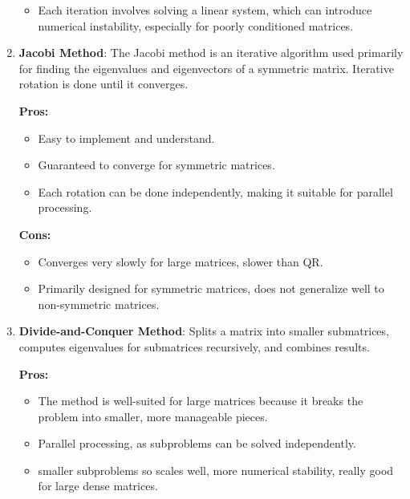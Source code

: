 \documentclass{article}
\theoremstyle{remark}
\begin{document}
\begin{enumerate}
\begin{itemize}
        \item Each iteration involves solving a linear system, which can introduce numerical instability, especially for poorly conditioned matrices.
    \end{itemize}

    

    \item \textbf{Jacobi Method}: The Jacobi method is an iterative algorithm used primarily for finding the eigenvalues and eigenvectors of a symmetric matrix. Iterative rotation is done until it converges.

    \textbf{Pros:}
    \begin{itemize}
        \item Easy to implement and understand.

        \item Guaranteed to converge for symmetric matrices.

        \item Each rotation can be done independently, making it suitable for parallel processing.
    \end{itemize}

    \textbf{Cons:}
    \begin{itemize}
        \item Converges very slowly for large matrices, slower than QR.

        \item Primarily designed for symmetric matrices, does not generalize well to non-symmetric matrices.
    \end{itemize}

    \item \textbf{Divide-and-Conquer Method}: Splits a matrix into smaller submatrices, computes eigenvalues for submatrices recursively, and combines results.

    \textbf{Pros:}
    \begin{itemize}
        \item The method is well-suited for large matrices because it breaks the problem into smaller, more manageable pieces.

        \item Parallel processing, as subproblems can be solved independently.

        \item smaller subproblems so scales well, more numerical stability, really good for large dense matrices.
    \end{itemize}


\end{enumerate}
\end{document}
